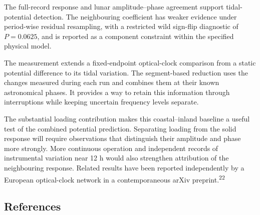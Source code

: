 \documentclass[
  12pt,
  a4paper,
]{article}
\begin{document}
The full-record response and lunar amplitude--phase agreement support
tidal-potential detection. The neighbouring coefficient has weaker
evidence under period-wise residual resampling, with a restricted wild
sign-flip diagnostic of \(P=0.0625\), and is reported as a component
constraint within the specified physical model.

The measurement extends a fixed-endpoint optical-clock comparison from a
static potential difference to its tidal variation. The segment-based
reduction uses the changes measured during each run and combines them at
their known astronomical phases. It provides a way to retain this
information through interruptions while keeping uncertain frequency
levels separate.

The substantial loading contribution makes this coastal--inland baseline
a useful test of the combined potential prediction. Separating loading
from the solid response will require observations that distinguish their
amplitude and phase more strongly. More continuous operation and
independent records of instrumental variation near 12 h would also
strengthen attribution of the neighbouring response. Related results
have been reported independently by a European optical-clock network in
a contemporaneous arXiv preprint.\textsuperscript{22}

\clearpage

\singlespacing\fontsize{11}{13}\selectfont

\hypertarget{references}{%
\subsection{References}\label{references}}
\end{document}
